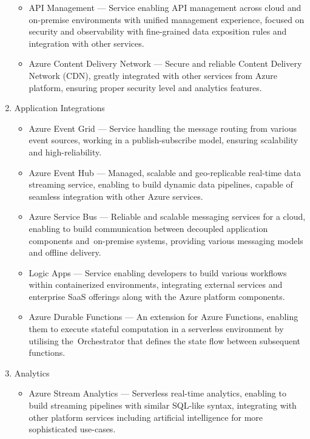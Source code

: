 \begin{enumerate}
   \begin{itemize}
       \item API Management --- Service enabling API management across cloud and on-premise environments with unified management experience, focused on security and observability with fine-grained data exposition rules and integration with other services.
       \item Azure Content Delivery Network --- Secure and reliable Content Delivery Network (CDN), greatly integrated with other services from Azure platform, ensuring proper security level and analytics features.
   \end{itemize}
   \item Application Integrations
   \begin{itemize}
       \item Azure Event Grid --- Service handling the message routing from various event sources, working in a publish-subscribe model, ensuring scalability and high-reliability.
       \item Azure Event Hub --- Managed, scalable and geo-replicable real-time data streaming service, enabling to build dynamic data pipelines, capable of seamless integration with other Azure services.
       \item Azure Service Bus --- Reliable and scalable messaging services for a cloud, enabling to build communication between decoupled application components and~on-premise systems, providing various messaging models and offline delivery.
       \item Logic Apps --- Service enabling developers to build various workflows within containerized environments, integrating external services and enterprise SaaS offerings along with the Azure platform components.
       \item Azure Durable Functions --- An extension for Azure Functions, enabling them to execute stateful computation in a serverless environment by utilising the~Orchestrator that defines the state flow between subsequent functions.
   \end{itemize}
   \item Analytics
   \begin{itemize}
       \item Azure Stream Analytics --- Serverless real-time analytics, enabling to build streaming pipelines with similar SQL-like syntax, integrating with other platform services including artificial intelligence for more sophisticated use-cases.
   \end{itemize}

\end{enumerate}
